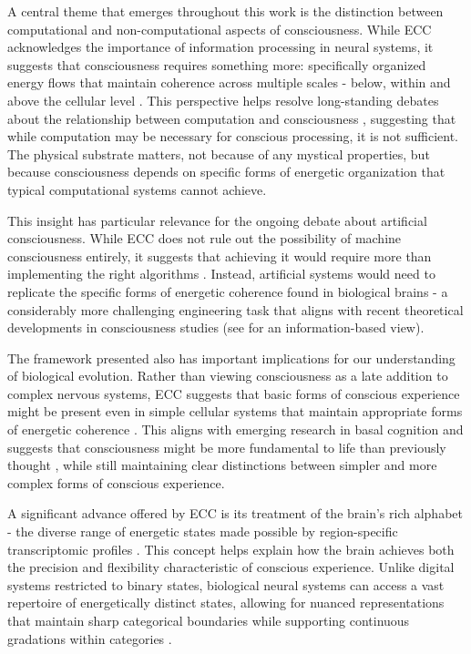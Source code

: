 \begin{refsection}
A central theme that emerges throughout this work is the distinction between computational and non-computational aspects of consciousness. While ECC acknowledges the importance of information processing in neural systems, it suggests that consciousness requires something more: specifically organized energy flows that maintain coherence across multiple scales - below, within and above the cellular level \cite{margulis2001conscious}. This perspective helps resolve long-standing debates about the relationship between computation and consciousness \cite{dennett1993consciousness}, suggesting that while computation may be necessary for conscious processing, it is not sufficient. The physical substrate matters, not because of any mystical properties, but because consciousness depends on specific forms of energetic organization that typical computational systems cannot achieve.

This insight has particular relevance for the ongoing debate about artificial consciousness. While ECC does not rule out the possibility of machine consciousness entirely, it suggests that achieving it would require more than implementing the right algorithms \cite{block1995confusion}. Instead, artificial systems would need to replicate the specific forms of energetic coherence found in biological brains - a considerably more challenging engineering task that aligns with recent theoretical developments in consciousness studies (see \cite{tononi2015consciousness} for an information-based view).

The framework presented also has important implications for our understanding of biological evolution. Rather than viewing consciousness as a late addition to complex nervous systems, ECC suggests that basic forms of conscious experience might be present even in simple cellular systems that maintain appropriate forms of energetic coherence \cite{margulis2001conscious}. This aligns with emerging research in basal cognition and suggests that consciousness might be more fundamental to life than previously thought \cite{levin2019computational,Lyon2021}, while still maintaining clear distinctions between simpler and more complex forms of conscious experience.

A significant advance offered by ECC is its treatment of the brain's rich alphabet - the diverse range of energetic states made possible by region-specific transcriptomic profiles \cite{Tasic2018}. This concept helps explain how the brain achieves both the precision and flexibility characteristic of conscious experience. Unlike digital systems restricted to binary states, biological neural systems can access a vast repertoire of energetically distinct states, allowing for nuanced representations that maintain sharp categorical boundaries while supporting continuous gradations within categories \cite{Freedman2011}.


\end{refsection}
